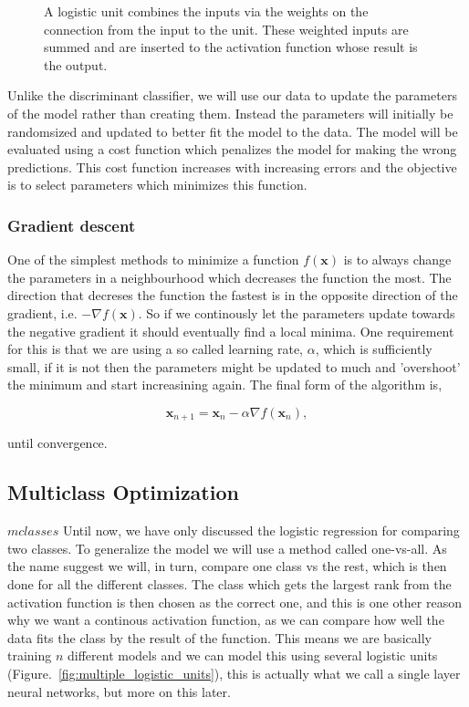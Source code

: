 \begin{figure}
\centering

\caption{\label{fig:logistic_unit}A logistic unit combines the inputs via the weights on the connection from the input to the unit. These weighted inputs are summed and are inserted to the activation function whose result is the output.}
\end{figure}

Unlike the discriminant classifier, we will use our data to update the parameters of the model rather than creating them. Instead the parameters will initially be randomsized and updated to better fit the model to the data. The model will be evaluated using a cost function which penalizes the model for making the wrong predictions. This cost function increases with increasing errors and the objective is to select parameters which minimizes this function.

\subsubsection{Gradient descent}

One of the simplest methods to minimize a function $f(\bm{x})$ is to always change the parameters in a neighbourhood which decreases the function the most. The direction that decreses the function the fastest is in the opposite direction of the gradient, i.e. $-\nabla f(\bm{x})$. So if we continously let the parameters update towards the negative gradient it should eventually find a local minima. One requirement for this is that we are using a so called learning rate, $\alpha$, which is sufficiently small, if it is not then the parameters might be updated to much and 'overshoot' the minimum and start increasining again. The final form of the algorithm is,

\begin{equation}
    \bm{x}_{n+1} = \bm{x}_n-\alpha \nabla f(\bm{x}_n),
\end{equation}

until convergence.

\subsection{Multiclass Optimization}
 $m classes$
Until now, we have only discussed the logistic regression for comparing two classes. To generalize the model we will use a method called one-vs-all. As the name suggest we will, in turn, compare one class vs the rest, which is then done for all the different classes. The class which gets the largest rank from the activation function is then chosen as the correct one, and this is one other reason why we want a continous activation function, as we can compare how well the data fits the class by the result of the function. This means we are basically training $n$ different models and we can model this using several logistic units (Figure.~\ref{fig:multiple_logistic_units}), this is actually what we call a single layer neural networks, but more on this later.

